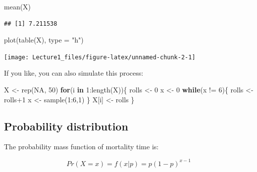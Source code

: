 \documentclass[]{tufte-handout}
\newenvironment{Shaded}{}{}
\newcommand{\AttributeTok}[1]{\textcolor[rgb]{0.49,0.56,0.16}{#1}}
\newcommand{\ConstantTok}[1]{\textcolor[rgb]{0.53,0.00,0.00}{#1}}
\newcommand{\ControlFlowTok}[1]{\textcolor[rgb]{0.00,0.44,0.13}{\textbf{#1}}}
\newcommand{\DecValTok}[1]{\textcolor[rgb]{0.25,0.63,0.44}{#1}}
\newcommand{\FunctionTok}[1]{\textcolor[rgb]{0.02,0.16,0.49}{#1}}
\newcommand{\NormalTok}[1]{#1}
\newcommand{\OtherTok}[1]{\textcolor[rgb]{0.00,0.44,0.13}{#1}}
\newcommand{\SpecialCharTok}[1]{\textcolor[rgb]{0.25,0.44,0.63}{#1}}
\newcommand{\StringTok}[1]{\textcolor[rgb]{0.25,0.44,0.63}{#1}}
\begin{document}
\begin{Shaded}
\begin{Highlighting}[]
\FunctionTok{mean}\NormalTok{(X)}
\end{Highlighting}
\end{Shaded}

\begin{verbatim}
## [1] 7.211538
\end{verbatim}

\begin{Shaded}
\begin{Highlighting}[]
\FunctionTok{plot}\NormalTok{(}\FunctionTok{table}\NormalTok{(X), }\AttributeTok{type =} \StringTok{"h"}\NormalTok{)}
\end{Highlighting}
\end{Shaded}

\texttt{[image: Lecture1\_files/figure-latex/unnamed-chunk-2-1]}

If you like, you can also simulate this process:

\begin{Shaded}
\begin{Highlighting}[]
\NormalTok{X }\OtherTok{\textless{}{-}} \FunctionTok{rep}\NormalTok{(}\ConstantTok{NA}\NormalTok{, }\DecValTok{50}\NormalTok{)}
\ControlFlowTok{for}\NormalTok{(i }\ControlFlowTok{in} \DecValTok{1}\SpecialCharTok{:}\FunctionTok{length}\NormalTok{(X))\{}
\NormalTok{    rolls }\OtherTok{\textless{}{-}} \DecValTok{0}
\NormalTok{    x }\OtherTok{\textless{}{-}} \DecValTok{0}
    \ControlFlowTok{while}\NormalTok{(x }\SpecialCharTok{!=} \DecValTok{6}\NormalTok{)\{}
\NormalTok{        rolls }\OtherTok{\textless{}{-}}\NormalTok{ rolls}\SpecialCharTok{+}\DecValTok{1}
\NormalTok{        x }\OtherTok{\textless{}{-}} \FunctionTok{sample}\NormalTok{(}\DecValTok{1}\SpecialCharTok{:}\DecValTok{6}\NormalTok{,}\DecValTok{1}\NormalTok{)}
\NormalTok{    \}}
\NormalTok{    X[i] }\OtherTok{\textless{}{-}}\NormalTok{ rolls}
\NormalTok{\}}
\end{Highlighting}
\end{Shaded}

\subsection{Probability distribution}\label{probability-distribution}

The probability mass function of mortality time is:

\[Pr(X = x) = f(x|p) = p(1-p)^{x-1}\]
\end{document}
